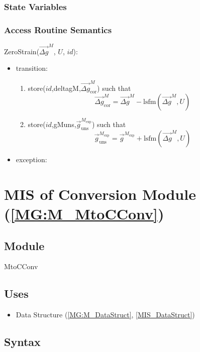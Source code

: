 \documentclass[12pt, titlepage]{article}
\begin{document}
\subsubsection{State Variables}


\subsubsection{Access Routine Semantics}

\noindent ZeroStrain($\overrightarrow{\Delta g}^M$, $U$, $id$):
\begin{itemize}  
\item transition:
	\begin{enumerate}
	\item store($id$,deltagM,$\overrightarrow{\Delta g}_{\text{cor}}^M$) such that
	\begin{equation*}
\overrightarrow{\Delta g}_{\text{cor}}^M = \overrightarrow{\Delta g}^M - \text{lsfm}(\overrightarrow{\Delta g}^M,U)
	\end{equation*}
	\item store($id$,gMuns,$\overrightarrow{g}_{\text{uns}}^{M_{\text{exp}}}$) such that
	\begin{equation*}
\overrightarrow{g}_{\text{uns}}^{M_{\text{exp}}} = \overrightarrow{g}^{M_{\text{exp}}} + \text{lsfm}(\overrightarrow{\Delta g}^M,U)
	\end{equation*}
	\end{enumerate}	 
\item exception: 
\end{itemize}

\section{MIS of Conversion Module (\texorpdfstring{\cref{MG:M_MtoCConv}}))} \label{MIS_MtoCConv}

\subsection{Module}
MtoCConv
\subsection{Uses}
\begin{itemize}
\item Data Structure (\cref{MG:M_DataStruct}, \cref{MIS_DataStruct})
\end{itemize}

\subsection{Syntax}
\end{document}
